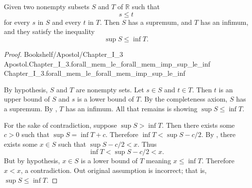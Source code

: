 \documentclass{article}
\newcommand{\link}[1]{\lean{../..}
  {Bookshelf/Apostol/Chapter\_I\_3}
  {Apostol.Chapter\_I\_3.#1}
  {Chapter\_I\_3.#1}
}
\begin{document}
\section*{}%
%

Given two nonempty subsets $S$ and $T$ of $\mathbb{R}$ such that $$s \leq t$$
  for every $s$ in $S$ and every $t$ in $T$. Then $S$ has a supremum, and $T$
  has an infimum, and they satisfy the inequality $$\sup{S} \leq \inf{T}.$$

\begin{proof}

  \link{forall\_mem\_le\_forall\_mem\_imp\_sup\_le\_inf}

  \divider

  By hypothesis, $S$ and $T$ are nonempty sets.
  Let $s \in S$ and $t \in T$.
  Then $t$ is an upper bound of $S$ and $s$ is a lower bound of $T$.
  By the completeness axiom, $S$ has a supremum.
  By , $T$ has an infimum.
  All that remains is showing $\sup{S} \leq \inf{T}$.

  For the sake of contradiction, suppose $\sup{S} > \inf{T}$.
  Then there exists some $c > 0$ such that $\sup{S} = \inf{T} + c$.
  Therefore $\inf{T} < \sup{S} - c / 2$.
  By , there exists some $x \in S$ such that
    $\sup{S} - c / 2 < x$.
  Thus $$\inf{T} < \sup{S} - c / 2 < x.$$
  But by hypothesis, $x \in S$ is a lower bound of $T$ meaning $x \leq \inf{T}$.
  Therefore $x < x$, a contradiction.
  Out original assumption is incorrect; that is, $\sup{S} \leq \inf{T}$.

\end{proof}
\end{document}
